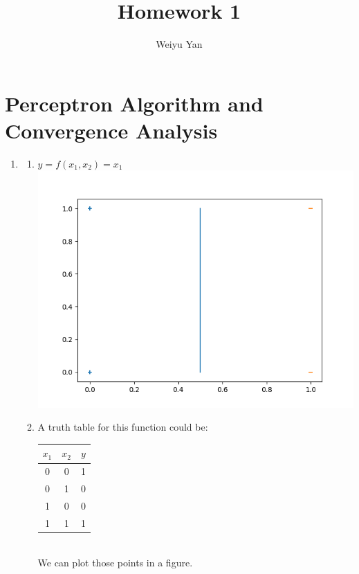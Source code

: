 \documentclass[11pt, oneside]{article}   	%
\title{Homework 1}
\author{Weiyu Yan}
\date{}							%
\begin{document}
\maketitle
\section{Perceptron Algorithm and Convergence Analysis}

\begin{enumerate}
\item	%
  \begin{enumerate}
  \item	%
    $ y=f(x_1,x_2)=x_1 $\\
    \includegraphics[width=15cm]{1.1a.png}\\
  \item	%
    A truth table for this function could be:\\
    \begin{tabular}{|c|c|c|}
      \hline
      $x_1$ & $x_2$ & $y$ \\ \hline
      0     & 0     & 1   \\ \hline
      0     & 1     & 0   \\ \hline
      1     & 0     & 0   \\ \hline
      1     & 1     & 1   \\ \hline
    \end{tabular}\\
    We can plot those points in a figure.\\

\end{enumerate}
\end{enumerate}
\end{document}
